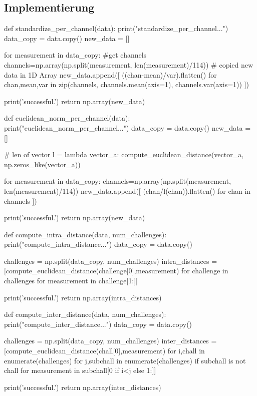 \subsection{Implementierung}

\begin{python}
def standardize_per_channel(data):
	print("standardize_per_channel...")
	data_copy = data.copy()
	new_data = []
	
	for measurement in data_copy: 
		#get channels
		channels=np.array(np.split(measurement, len(measurement)/114)) 
		# copied new data in 1D Array
		new_data.append([ ((chan-mean)/var).flatten() for chan,mean,var in zip(channels, channels.mean(axis=1), channels.var(axis=1)) ])
    
	print('successful.')
	return np.array(new_data)
\end{python}

\hfill \break
\hfill \break

\begin{python}

def euclidean_norm_per_channel(data):
	print("euclidean_norm_per_channel...")
	data_copy = data.copy()
	new_data = []
	
	# len of vector
	l = lambda vector_a: compute_euclidean_distance(vector_a, np.zeros_like(vector_a))
	
	for measurement in data_copy: 
		channels=np.array(np.split(measurement, len(measurement)/114))
		new_data.append([ (chan/l(chan)).flatten() for chan in channels ])


	print('successful.')
	return np.array(new_data)
\end{python}
\newpage
\begin{python}    
def compute_intra_distance(data, num_challenges):
	print("compute_intra_distance...")
	data_copy = data.copy()

	challenges = np.split(data_copy, num_challenges)
	intra_distances = [compute_euclidean_distance(challenge[0],measurement) 
                       for challenge in challenges
                       for measurement in challenge[1:]]
    
	print('successful.')
	return np.array(intra_distances)
\end{python}

\hfill \break
\hfill \break

\begin{python}
def compute_inter_distance(data, num_challenges):
	print("compute_inter_distance...")
	data_copy = data.copy()

	challenges = np.split(data_copy, num_challenges)
	inter_distances = [compute_euclidean_distance(chall[0],measurement)
                       for i,chall in enumerate(challenges)
                       for j,subchall in enumerate(challenges)
                       if subchall is not chall
                       for measurement in subchall[0 if i<j else 1:]]

	print('successful.')
	return np.array(inter_distances)
\end{python}